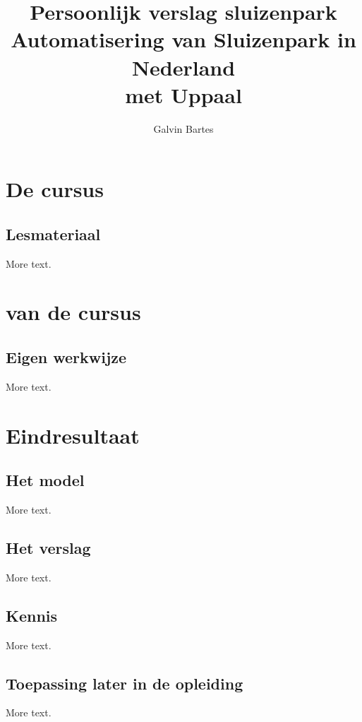 \documentclass[11pt]{article} %
\title{Persoonlijk verslag sluizenpark \\
\large Automatisering van Sluizenpark in Nederland\\
    met Uppaal}
\author{Galvin Bartes}
\begin{document}
\maketitle

\section{De cursus}

 

\subsection{Lesmateriaal}

More text.



\section{  van de cursus}

 

\subsection{Eigen werkwijze}

More text.



\section{Eindresultaat}

 

\subsection{Het model}

More text.

\subsection{Het verslag}

More text.

\subsection{Kennis}

More text.


\subsection{Toepassing later in de opleiding}

More text.
\end{document}
